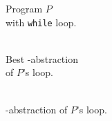 \begin{minipage}[t]{0.3\linewidth} \centering
	\begin{figure}[H]
		
		\caption{Program $P$ \\ with \texttt{while} loop.}
	\end{figure}
\end{minipage}
\begin{minipage}[t]{0.35\linewidth} \centering
	\begin{figure}[H]
			
			\caption{\\ Best \qvasr-abstraction \\ of $P$'s loop.}
	\end{figure}
\end{minipage}
\begin{minipage}[t]{0.3\linewidth} \centering
	\begin{figure}[H]
		
		\caption{\\ \qvasrs-abstraction of $P$'s loop.}
	\end{figure}
\end{minipage}

